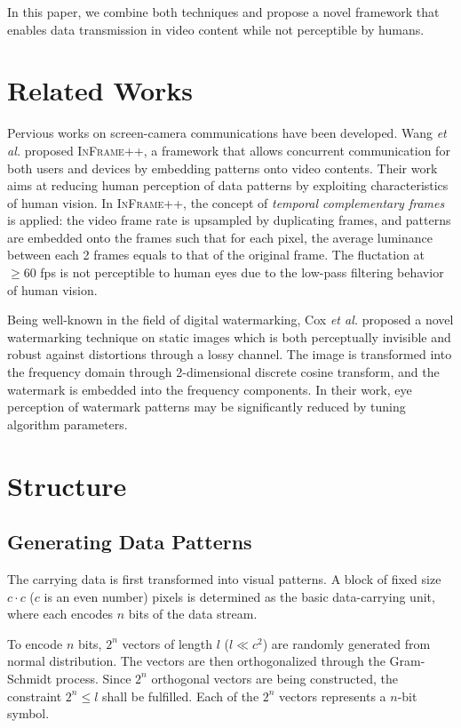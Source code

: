 \documentclass{acm_proc_article-sp}
\begin{document}
In this paper, we combine both techniques and propose a novel framework that enables data transmission in video content while not perceptible by humans.

\section{Related Works}
Pervious works on screen-camera communications have been developed. Wang \textit{et al.} proposed \textsc{InFrame++}\cite{wang2015inframe++}, a framework that allows concurrent communication for both users and devices by embedding patterns onto video contents. Their work aims at reducing human perception of data patterns by exploiting characteristics of human vision. In \textsc{InFrame++}, the concept of \textit{temporal complementary frames} is applied: the video frame rate is upsampled by duplicating frames, and patterns are embedded onto the frames such that for each pixel, the average luminance between each 2 frames equals to that of the original frame. The fluctation at $\geq 60$ fps is not perceptible to human eyes due to the low-pass filtering behavior of human vision.

Being well-known in the field of digital watermarking, Cox \textit{et al.}\cite{cox1997secure} proposed a novel watermarking technique on static images which is both perceptually invisible and robust against distortions through a lossy channel. The image is transformed into the frequency domain through 2-dimensional discrete cosine transform, and the watermark is embedded into the frequency components. In their work, eye perception of watermark patterns may be significantly reduced by tuning algorithm parameters.

\section{Structure}
\subsection{Generating Data Patterns}
The carrying data is first transformed into visual patterns. A block of fixed size $c \cdot c$ ($c$ is an even number) pixels is determined as the basic data-carrying unit, where each encodes $n$ bits of the data stream.

To encode $n$ bits, $2^n$ vectors of length $l$ ($l \ll c^2$) are randomly generated from normal distribution. The vectors are then orthogonalized through the Gram-Schmidt process. Since $2^n$ orthogonal vectors are being constructed, the constraint $2^n \leq l$ shall be fulfilled. Each of the $2^n$ vectors represents a $n$-bit symbol.
\end{document}
